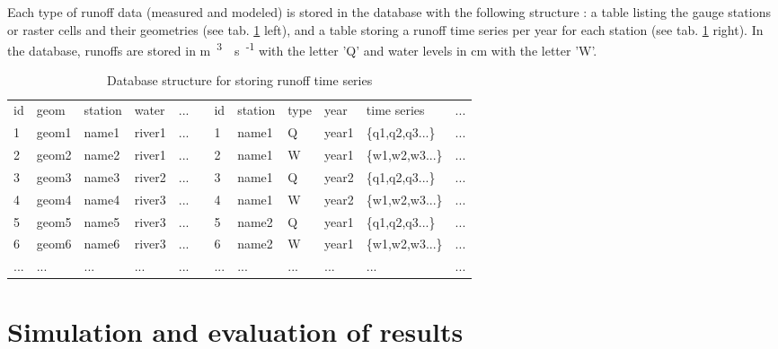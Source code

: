 Each type of runoff data (measured and modeled) is stored in the database with the following structure : a table listing the gauge stations or raster cells and their geometries (see tab. \ref{db_struct} left), and a table storing a runoff time series per year for each station (see tab. \ref{db_struct} right). In the database, runoffs are stored in \unit{m\textsuperscript{3}\textperiodcentered s\textsuperscript{-1}} with the letter 'Q' and water levels in \unit{cm} with the letter 'W'.

\begin{table}[H]
\footnotesize
  \centering
  \caption{Database structure for storing runoff time series}
  \label{db_struct}
  \begin{tabular}{|l|l|l|l|ll|l|l|l|l|l|l}
  \cline{1-5}\cline{7-12}
  id & geom &station & water & ...&& id & station & type & year & time series & ...\\
  \cline{1-5}\cline{7-12}
  1&geom1&name1&river1&...&&1&name1&Q&year1&\{q1,q2,q3...\}&...\\\cline{1-5}\cline{7-12}
  2&geom2&name2&river1&...&&2&name1&W&year1&\{w1,w2,w3...\}&...\\\cline{1-5}\cline{7-12}
  3&geom3&name3&river2&...&&3&name1&Q&year2&\{q1,q2,q3...\}&...\\\cline{1-5}\cline{7-12}
  4&geom4&name4&river3&...&&4&name1&W&year2&\{w1,w2,w3...\}&...\\\cline{1-5}\cline{7-12}
  5&geom5&name5&river3&...&&5&name2&Q&year1&\{q1,q2,q3...\}&...\\\cline{1-5}\cline{7-12}
  6&geom6&name6&river3&...&&6&name2&W&year1&\{w1,w2,w3...\}&...\\\cline{1-5}\cline{7-12}
  ...&...&...&...&...&&...&...&...&...&...&...\\
  \end{tabular}
\end{table}


\section{Simulation and evaluation of results}

\label{sec:simu_res}

